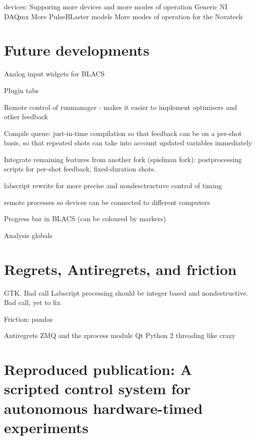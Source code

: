 devices:
Supporing more devices and more modes of operation
Generic NI DAQmx
More PulseBLaster models
More modes of operation for the Novatech

\section{Future developments}

Analog input widgets for BLACS

Plugin tabs

Remote control of runmanager - makes it easier to implement optimisers and other feedback

Compile queue: just-in-time compilation so that feedback can be on a per-shot basis, so that repeated shots can take into account updated variables immediately

Integrate remaining features from another fork (spielman fork): postprocessing scripts for per-shot feedback, fixed-duration shots.

labscript rewrite for more precise and nondesctructuve control of timing

remote processes so devices can be connected to different computers

Progress bar in BLACS (can be coloured by markers)

Analysis globals

\section{Regrets, Antiregrets, and friction}
GTK. Bad call
Labscript processing should be integer based and nondestructive. Bad call, yet to fix

Friction:
pandas

Antiregrets
ZMQ and the zprocess module
Qt
Python 2
threading like crazy

\section{Reproduced publication: A scripted control system for autonomous hardware-timed experiments}

